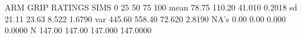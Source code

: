 \begin{Schunk}
\begin{Soutput}
        ARM   GRIP RATINGS     SIMS
0%    19.00  29.00  21.600  -4.1700
25%   64.50  94.00  34.800  -0.9650
50%   81.50 111.00  41.300   0.1600
75%   94.00 124.50  47.700   1.0700
100% 132.00 189.00  57.200   5.1700
mean  78.75 110.20  41.010   0.2018
sd    21.11  23.63   8.522   1.6790
var  445.60 558.40  72.620   2.8190
NA's   0.00   0.00   0.000   0.0000
N    147.00 147.00 147.000 147.0000
\end{Soutput}
\end{Schunk}
